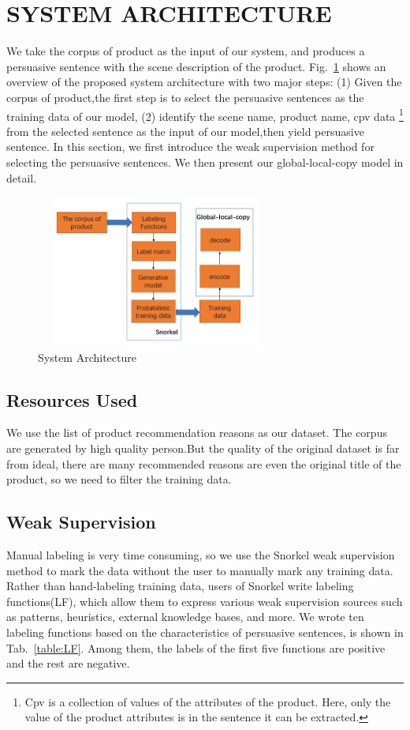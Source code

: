 \documentclass[sigconf]{acmart}
\begin{document}
\section{SYSTEM ARCHITECTURE}\label{sec:architecture}
We take the corpus of product as the input of our system, and produces a persuasive sentence with the scene description of the product. Fig.~\ref{fig:system-architecture} shows an overview of the proposed system architecture with two major steps: (1) Given the corpus of product,the first step is to select the persuasive sentences as the training data of our model, (2) identify the scene name, product name, cpv data \footnote{Cpv is a collection of values of the attributes of the product. Here, only the value of the product attributes is in the sentence it can be extracted.} from the selected sentence as the input of our model,then yield persuasive sentence. In this section, we first introduce the weak supervision method for selecting the persuasive sentences. We then present our global-local-copy model in detail.  

\begin{figure}
    \centering
    \includegraphics[width=8cm,height=5cm]{system-architecture.jpg}
\caption{System Architecture}\label{fig:system-architecture}
\end{figure}

\subsection{Resources Used}
We use the list of product recommendation reasons as our dataset. The corpus are generated by high quality person.But the quality of the original dataset is far from ideal, there are many recommended reasons are even the original title of the product, so we need to filter the training data.

\subsection{Weak Supervision}
Manual labeling is very time consuming, so we use the Snorkel \cite{ratner2017snorkel} weak supervision method to mark the data without the user to manually mark any training data. Rather than hand-labeling training data, users of Snorkel write labeling functions(LF), which allow them to express various weak supervision sources such as patterns, heuristics, external knowledge bases, and more. We wrote ten labeling functions based on the characteristics of persuasive sentences, is shown in Tab.~\ref{table:LF}. Among them, the labels of the first five functions are positive and the rest are negative.
\end{document}
